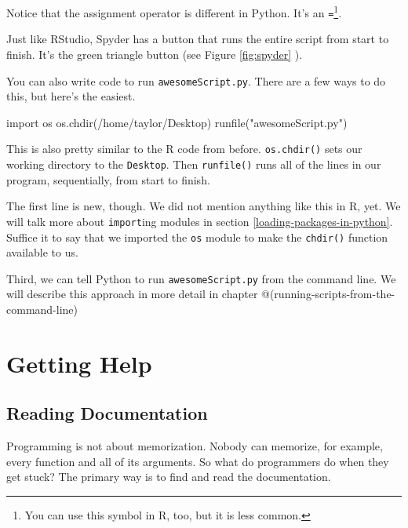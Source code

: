 \documentclass[
  12pt,
]{krantz}
\makeatletter
\newenvironment{Shaded}{\begin{snugshade}}{\end{snugshade}}
\newcommand{\ImportTok}[1]{#1}
\newcommand{\NormalTok}[1]{#1}
\newcommand{\StringTok}[1]{\textcolor[rgb]{0.5,0.5,0.5}{#1}}
\newenvironment{kframe}{%
\medskip{}
\setlength{\fboxsep}{.8em}
 \def\at@end@of@kframe{}%
 \ifinner\ifhmode%
  \def\at@end@of@kframe{\end{minipage}}%
  \begin{minipage}{\columnwidth}%
 \fi\fi%
 \def\FrameCommand##1{\hskip\@totalleftmargin \hskip-\fboxsep
 \colorbox{shadecolor}{##1}\hskip-\fboxsep
     \hskip-\linewidth \hskip-\@totalleftmargin \hskip\columnwidth}%
 \MakeFramed {\advance\hsize-\width
   \@totalleftmargin\z@ \linewidth\hsize
   \@setminipage}}%
 {\par\unskip\endMakeFramed%
 \at@end@of@kframe}
\renewenvironment{Shaded}{\begin{kframe}}{\end{kframe}}
\makeatother
\begin{document}
Notice that the assignment operator is different in Python. It's an \texttt{=}\footnote{You can use this symbol in R, too, but it is less common.}.

Just like RStudio, Spyder has a button that runs the entire script from start to finish. It's the green triangle button (see Figure \ref{fig:spyder} ).

You can also write code to run \texttt{awesomeScript.py}. There are a few ways to do this, but here's the easiest.

\begin{Shaded}
\begin{Highlighting}[]
\ImportTok{import}\NormalTok{ os}
\NormalTok{os.chdir(}\StringTok{\textquotesingle{}/home/taylor/Desktop\textquotesingle{}}\NormalTok{)}
\NormalTok{runfile(}\StringTok{"awesomeScript.py"}\NormalTok{)}
\end{Highlighting}
\end{Shaded}

This is also pretty similar to the R code from before. \texttt{os.chdir()} sets our working directory to the \texttt{Desktop}. Then \texttt{runfile()} runs all of the lines in our program, sequentially, from start to finish.

The first line is new, though. We did not mention anything like this in R, yet. We will talk more about \texttt{import}ing modules in section \ref{loading-packages-in-python}. Suffice it to say that we imported the \texttt{os} module to make the \texttt{chdir()} function available to us.

Third, we can tell Python to run \texttt{awesomeScript.py} from the command line. We will describe this approach in more detail in chapter @(running-scripts-from-the-command-line)

\hypertarget{getting-help}{%
\section{Getting Help}\label{getting-help}}

\hypertarget{reading-documentation}{%
\subsection{Reading Documentation}\label{reading-documentation}}

Programming is not about memorization. Nobody can memorize, for example, every function and all of its arguments. So what do programmers do when they get stuck? The primary way is to find and read the documentation.
\end{document}
